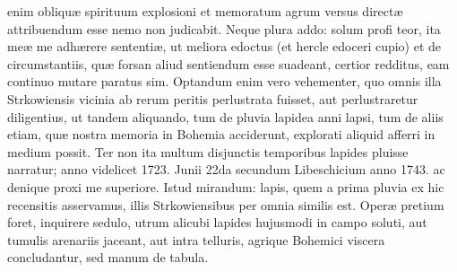 \documentclass[a4paper, 11pt, oneside, polutonikogreek, latin]{article}
\begin{document}
enim obliquæ spirituum explosioni et memoratum agrum versus directæ attribuendum esse nemo non judicabit. Neque plura addo: solum profi teor, ita meæ me adhærere sententiæ, ut meliora edoctus (et hercle edoceri cupio) et de circumstantiis, quæ forsan aliud sentiendum esse suadeant, certior redditus, eam continuo mutare paratus sim. Optandum enim vero vehementer, quo omnis illa Strkowiensis vicinia ab rerum peritis perlustrata fuisset, aut perlustraretur diligentius, ut tandem aliquando, tum de pluvia lapidea anni lapsi, tum de aliis etiam, quæ nostra memoria in Bohemia acciderunt, explorati aliquid afferri in medium possit. Ter non ita multum disjunctis temporibus lapides pluisse narratur; anno videlicet 1723. Junii 22da secundum Libeschicium anno 1743. ac denique proxi me superiore. Istud mirandum: lapis, quem a prima pluvia ex hic recensitis asservamus, illis Strkowiensibus per omnia similis est. Operæ pretium foret, inquirere sedulo, utrum alicubi lapides hujusmodi in campo soluti, aut tumulis arenariis jaceant, aut intra telluris, agrique Bohemici viscera concludantur, sed manum de tabula.
\clearpage
\end{document}
